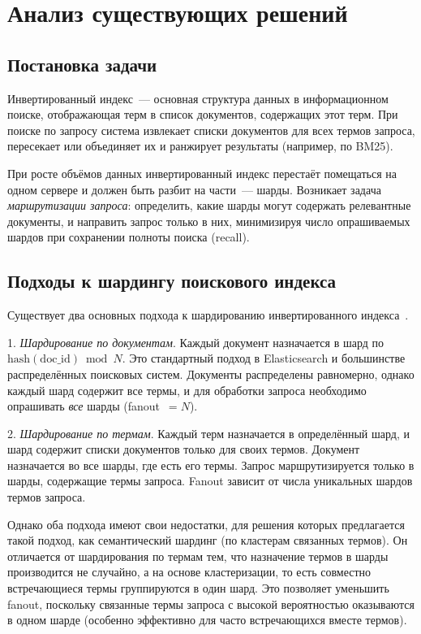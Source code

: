 \documentclass[14pt, a4paper]{article}
\begin{document}
	\section{Анализ существующих решений}

	\subsection{Постановка задачи}

	Инвертированный индекс~--- основная структура данных в информационном поиске, отображающая терм в список документов, содержащих этот терм.
	При поиске по запросу система извлекает списки документов для всех термов запроса, пересекает или объединяет их и ранжирует результаты (например, по BM25).

	При росте объёмов данных инвертированный индекс перестаёт помещаться на одном сервере и должен быть разбит на части~--- шарды.
	Возникает задача \textit{маршрутизации запроса}: определить, какие шарды могут содержать релевантные документы, и направить запрос только в них, минимизируя число опрашиваемых шардов при сохранении полноты поиска (recall).

	\subsection{Подходы к шардингу поискового индекса}

	Существует два основных подхода к шардированию инвертированного индекса~.

	1. \textit{Шардирование по документам}.
	Каждый документ назначается в шард по $\mathrm{hash}(\mathrm{doc\_id}) \bmod N$.
	Это стандартный подход в Elasticsearch и большинстве распределённых поисковых систем.
	Документы распределены равномерно, однако каждый шард содержит все термы, и для обработки запроса необходимо опрашивать \textit{все} шарды (fanout~$= N$).

	2. \textit{Шардирование по термам}.
	Каждый терм назначается в определённый шард, и шард содержит списки документов только для своих термов.
	Документ назначается во все шарды, где есть его термы.
	Запрос маршрутизируется только в шарды, содержащие термы запроса.
	Fanout зависит от числа уникальных шардов термов запроса.

	Однако оба подхода имеют свои недостатки, для решения которых предлагается такой подход, как семантический шардинг (по кластерам связанных термов).
	Он отличается от шардирования по термам тем, что назначение термов в шарды производится не случайно, а на основе кластеризации, то есть совместно встречающиеся термы группируются в один шард.
	Это позволяет уменьшить fanout, поскольку связанные термы запроса с высокой вероятностью оказываются в одном шарде (особенно эффективно для часто встречающихся вместе термов).
\end{document}
